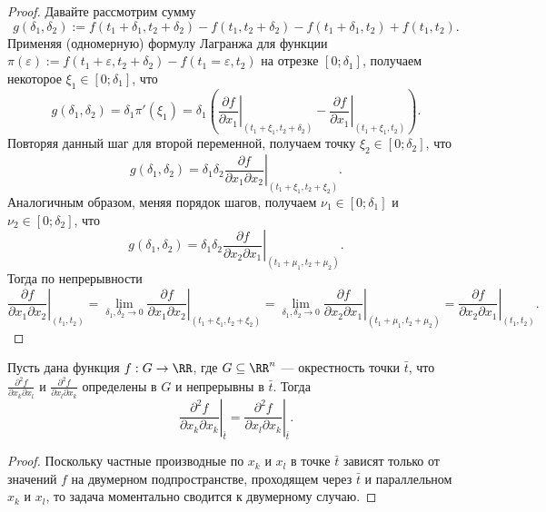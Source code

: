 \documentclass[12pt,a4paper]{article}
\begin{document}
    \begin{proof}
        Давайте рассмотрим сумму
        \[g(\delta_1, \delta_2) := f(t_1 + \delta_1, t_2 + \delta_2) - f(t_1, t_2 + \delta_2) - f(t_1 + \delta_1, t_2) + f(t_1, t_2).\]
        Применяя (одномерную) формулу Лагранжа для функции $\pi(\varepsilon) := f(t_1 + \varepsilon, t_2 + \delta_2) - f(t_1 = \varepsilon, t_2)$ на отрезке $[0; \delta_1]$, получаем некоторое $\xi_1 \in [0; \delta_1]$, что
        \[g(\delta_1, \delta_2) = \delta_1 \pi'(\xi_1) = \delta_1 \left(\left. \frac{\partial f}{\partial x_1} \right|_{(t_1 + \xi_1, t_2 + \delta_2)} - \left. \frac{\partial f}{\partial x_1} \right|_{(t_1 + \xi_1, t_2)}\right).\]
        Повторяя данный шаг для второй переменной, получаем точку $\xi_2 \in [0; \delta_2]$, что
        \[g(\delta_1, \delta_2) = \delta_1 \delta_2 \left. \frac{\partial f}{\partial x_1 \partial x_2} \right|_{(t_1 + \xi_1, t_2 + \xi_2)}.\]
        Аналогичным образом, меняя порядок шагов, получаем $\nu_1 \in [0; \delta_1]$ и $\nu_2 \in [0; \delta_2]$, что
        \[g(\delta_1, \delta_2) = \delta_1 \delta_2 \left. \frac{\partial f}{\partial x_2 \partial x_1} \right|_{(t_1 + \mu_1, t_2 + \mu_2)}.\]
        Тогда по непрерывности
        \[
            \left. \frac{\partial f}{\partial x_1 \partial x_2} \right|_{(t_1, t_2)}
            = \lim_{\delta_1, \delta_2 \to 0} \left. \frac{\partial f}{\partial x_1 \partial x_2} \right|_{(t_1 + \xi_1, t_2 + \xi_2)}
            = \lim_{\delta_1, \delta_2 \to 0} \left. \frac{\partial f}{\partial x_2 \partial x_1} \right|_{(t_1 + \mu_1, t_2 + \mu_2)}
            = \left. \frac{\partial f}{\partial x_2 \partial x_1} \right|_{(t_1, t_2)}.
        \]
    \end{proof}

    \begin{corollary}
        Пусть дана функция $f: G \to \RR$, где $G \subseteq \RR^n$ --- окрестность точки $\bar{t}$, что $\frac{\partial^2 f}{\partial x_k \partial x_l}$ и $\frac{\partial^2 f}{\partial x_l \partial x_k}$ определены в $G$ и непрерывны в $\bar{t}$. Тогда
        \[\left. \frac{\partial^2 f}{\partial x_k \partial x_k} \right|_{\bar{t}} = \left. \frac{\partial^2 f}{\partial x_l \partial x_k} \right|_{\bar{t}}.\]
    \end{corollary}

    \begin{proof}
        Поскольку частные производные по $x_k$ и $x_l$ в точке $\bar{t}$ зависят только от значений $f$ на двумерном подпространстве, проходящем через $\bar{t}$ и параллельном $x_k$ и $x_l$, то задача моментально сводится к двумерному случаю.
    \end{proof}
\end{document}
